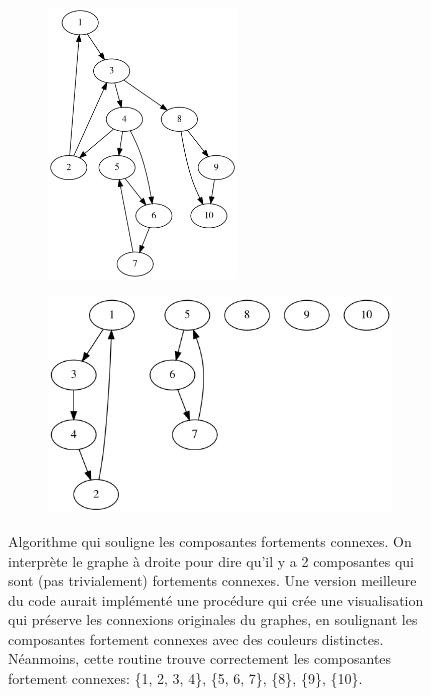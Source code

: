 \documentclass[10pt]{article} %
\begin{document}
\begin{figure}[h!]
    \centering
    \begin{subfigure}{0.45\textwidth}
        \centering
        \includegraphics[width=5cm]{media/digraph.png}
    \end{subfigure}
    \hfill
    \begin{subfigure}{0.45\textwidth}
        \centering
        \includegraphics[width=\textwidth]{media/digraph_sg.png}
    \end{subfigure}
    \caption{Algorithme qui souligne les composantes fortements connexes. On interprète le graphe à droite pour dire qu'il y a 2 composantes qui sont (pas trivialement) fortements connexes. Une version
    meilleure du code aurait implémenté une procédure qui crée une visualisation qui préserve les connexions originales du graphes, en soulignant les composantes fortement connexes avec des couleurs distinctes.
    Néanmoins, cette routine trouve correctement les composantes fortement connexes: \{1, 2, 3, 4\}, \{5, 6, 7\}, \{8\}, \{9\}, \{10\}.}
    \label{Fig:scc}

\end{figure}
\end{document}
